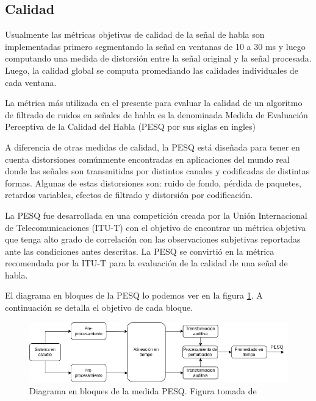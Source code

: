 \subsection{Calidad}

Usualmente las métricas objetivas de calidad de la señal de habla son implementadas primero segmentando la señal en ventanas de 10 a 30 ms y luego computando una medida de distorsión entre la señal original y la señal procesada. Luego, la calidad global se computa promediando las calidades individuales de cada ventana.

La métrica más utilizada en el presente para evaluar la calidad de un algoritmo de filtrado de ruidos en señales de habla es la denominada Medida de Evaluación Perceptiva de la Calidad del Habla \cite{perceptual_evaluation_of_speech_quality_a_new_method_for_speech_quality_assessment_of_telephone_networks_and_codecs,speech_enhancement_theory_and_practice} (PESQ por sus siglas en ingles)

A diferencia de otras medidas de calidad, la PESQ está diseñada para tener en cuenta distorsiones comúnmente encontradas en aplicaciones del mundo real donde las señales son transmitidas por distintos canales y codificadas de distintas formas.  Algunas de estas distorsiones son: ruido de fondo, pérdida de paquetes, retardos variables, efectos de filtrado y distorsión por codificación.

La PESQ fue desarrollada en una competición creada por la Unión Internacional de Telecomunicaciones (ITU-T) con el objetivo de encontrar un métrica objetiva que tenga alto grado de correlación con las observaciones subjetivas reportadas ante las condiciones antes descritas. La PESQ se convirtió en la métrica recomendada por la ITU-T para la evaluación de la calidad de una señal de habla.

El diagrama en bloques de la PESQ lo podemos ver en la figura \ref{fig:ch4_pesq_schematic}. A continuación se detalla el objetivo de cada bloque.

\begin{figure}
	\centering
	\centerline{\includegraphics[scale=0.6]{images/ch4/pesq_schematic.png}}
	\caption{Diagrama en bloques de la medida PESQ. Figura tomada de \cite{speech_enhancement_theory_and_practice}}
	\label{fig:ch4_pesq_schematic}
\end{figure}

